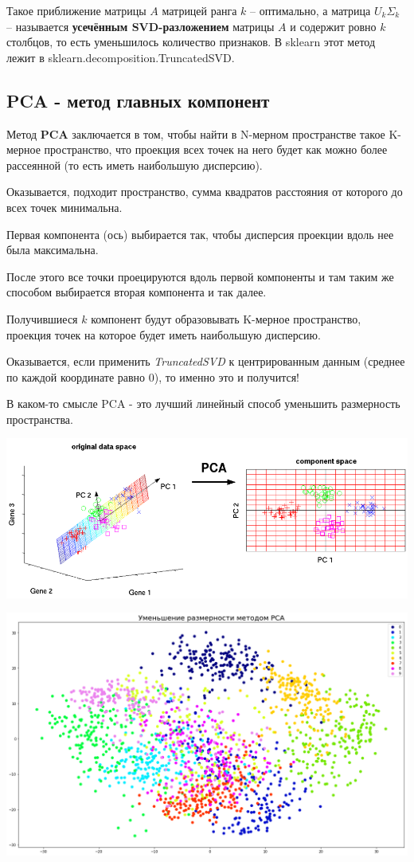 Такое приближение матрицы $A$ матрицей ранга $k$ -- оптимально, а матрица $U_{k} \Sigma_{k}$ -- называется \textbf{усечённым SVD-разложением} матрицы $A$ и содержит ровно $k$ столбцов, то есть уменьшилось количество признаков.
В sklearn этот метод лежит в sklearn.decomposition.TruncatedSVD.

\subsection{PCA - метод главных компонент}

Метод \textbf{PCA} заключается в том, чтобы найти в N-мерном пространстве такое K-мерное пространство, что проекция всех точек на него будет как можно более рассеянной (то есть иметь наибольшую дисперсию).

Оказывается, подходит пространство, сумма квадратов расстояния от которого до всех точек минимальна.

Первая компонента (ось) выбирается так, чтобы дисперсия проекции вдоль нее была максимальна.

После этого все точки проецируются вдоль первой компоненты и там таким же способом выбирается вторая компонента и так далее.

Получившиеся $k$ компонент будут образовывать K-мерное пространство, проекция точек на которое будет иметь наибольшую дисперсию.

Оказывается, если применить \textit{TruncatedSVD} к центрированным данным (среднее по каждой координате равно 0), то именно это и получится!

В каком-то смысле PCA - это лучший линейный способ уменьшить размерность пространства.

\begin{center}
    \includegraphics[scale=0.5]{tickets/pictures/pca.png}
\end{center}
\begin{center}
    \includegraphics[scale=0.45]{tickets/pictures/pca_sample.png}
\end{center}
